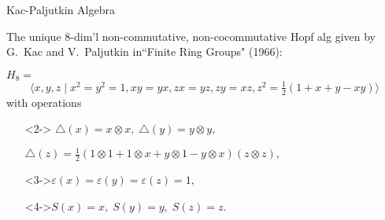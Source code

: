 \documentclass{beamer}
\begin{document}
\begin{frame}{Kac-Paljutkin Algebra}


 The unique $8$-dim'l non-commutative, non-cocommutative Hopf alg given by G.\ Kac and V.\ Paljutkin in``Finite Ring Groups" (1966):\newline

    $H_8=$
    \[\Big\langle x,y,z\;\vert\; x^2=y^2=1,xy=yx,zx=yz,zy=xz,z^2=\tfrac{1}{2}(1+x+y-xy)\Big\rangle\]
    with operations
    \vspace{2ex}
    \begin{itemize}
    \setlength{\itemsep}{2ex}
    \item[]<2->
    $\triangle(x)=x\otimes x,\; \triangle(y)=y\otimes y,\;$ 
    
    \vspace{2ex}
    
    $\triangle(z)=\tfrac{1}{2}(1\otimes 1+1\otimes x+y\otimes 1-y\otimes x)(z\otimes z),\;$
    
    \item[]<3->$
    \varepsilon(x)=\varepsilon(y)=\varepsilon(z)=1,$

    \item[]<4->$ S(x)=x,\;S(y)=y,\;S(z)=z.$ 
    \end{itemize}
\end{frame}
\end{document}

